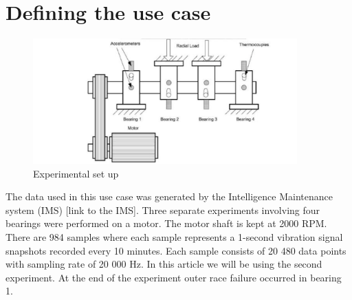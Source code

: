 \documentclass[11pt, oneside]{article}   	%
\begin{document}
\section{Defining the use case}
\begin{figure}[H] %
   \centering
   \includegraphics[width=4in]{experiment} 
   \caption{Experimental set up}
   \label{fig:exp}
\end{figure}
The data used in this use case was generated by the Intelligence Maintenance system (IMS) [link to the IMS].
Three separate experiments involving four bearings were performed on a motor. The motor shaft is kept at 2000 RPM.
There are 984 samples where each sample represents a 1-second vibration signal snapshots recorded every 10 minutes.
Each sample consists of 20 480 data points with sampling rate of 20 000 Hz.
In this article we will be using the second experiment. At the end of the experiment outer race failure occurred in bearing 1.
\end{document}
